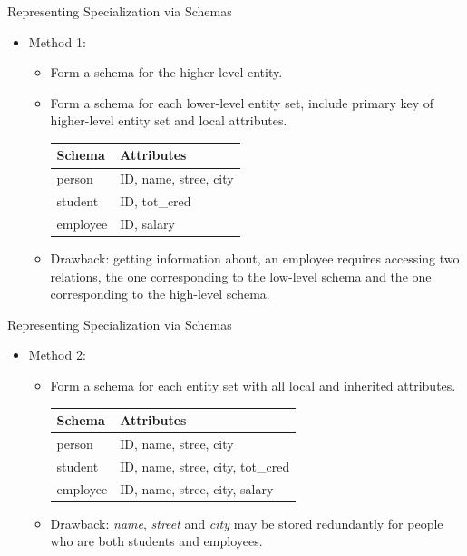 \documentclass{beamer}
\begin{document}
\begin{frame}{Representing Specialization via Schemas}
    \begin{itemize}
        \item Method 1:
        \begin{itemize}
            \item Form a schema for the higher-level entity.
            \item Form a schema for each lower-level entity set, include primary key of higher-level entity set and local attributes.\\
            \vspace{3mm}
            \begin{tabular}{l | l}
                Schema & Attributes \\ \hline
                person      & ID, name, stree, city \\
                student     & ID, tot\_cred \\
                employee    & ID, salary \\
            \end{tabular}
            \bigskip
            \item Drawback: getting information about, an employee requires accessing two relations, the one corresponding to the low-level schema and the one corresponding to the high-level schema.
        \end{itemize}
    \end{itemize}
\end{frame}

\begin{frame}{Representing Specialization via Schemas}
    \begin{itemize}
        \item Method 2:
        \begin{itemize}
            \item Form a schema for each entity set with all local and inherited attributes.\\
            \vspace{3mm}
            \begin{tabular}{l | l}
                Schema & Attributes \\ \hline
                person      & ID, name, stree, city \\
                student     & ID, name, stree, city, tot\_cred \\
                employee    & ID, name, stree, city, salary \\
            \end{tabular}
            \bigskip
            \item Drawback: \textit{name}, \textit{street} and \textit{city} may be stored redundantly for people who are both students and employees.
        \end{itemize}
    \end{itemize}
\end{frame}
\end{document}

